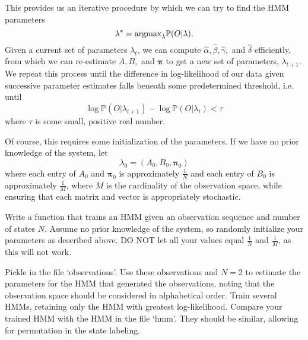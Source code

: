 This provides us an iterative procedure by which we can try to find the HMM parameters $$\lambda^{*} = \text{argmax}_{\lambda} \mathbb{P}(O | \lambda).$$ Given a current set of parameters $\lambda_{t}$, we can compute $\widehat{\alpha}, \widehat{\beta}, \widehat{\gamma},$ and $\widehat{\delta}$ efficiently, from which we can re-estimate $A, B,$ and $\mathbf{\pi}$ to get a new set of parameters, $\lambda_{t+1}$. We repeat this process until the difference in log-likelihood of our data given successive parameter estimates falls beneath some predetermined threshold, i.e. until $$\log \mathbb{P}(O | \lambda_{t+1}) - \log \mathbb{P}(O | \lambda_{t}) < \tau$$ where $\tau$ is some small, positive real number.

Of course, this requires some initialization of the parameters. If we have no prior knowledge of the system, let $$\lambda_{0} = \left( A_{0}, B_{0}, \mathbf{\pi}_{0} \right)$$ where each entry of $A_{0}$ and $\mathbf{\pi}_{0}$ is approximately $\frac{1}{N}$ and each entry of $B_{0}$ is approximately $\frac{1}{M}$, where $M$ is the cardinality of the observation space, while ensuring that each matrix and vector is appropriately stochastic.

\begin{problem}
Write a function that trains an HMM given an observation sequence and number of states $N$. Assume no prior knowledge of the system, so randomly initialize your parameters as described above. DO NOT let all your values equal $\frac{1}{N}$ and $\frac{1}{M}$, as this will not work.
\end{problem}

\begin{problem}
Pickle in the file `observations'. Use these observations and $N = 2$ to estimate the parameters for the HMM that generated the observations, noting that the observation space should be considered in alphabetical order. Train several HMMs, retaining only the HMM with greatest log-likelihood. Compare your trained HMM with the HMM in the file `hmm'. They should be similar, allowing for permutation in the state labeling.
\end{problem}